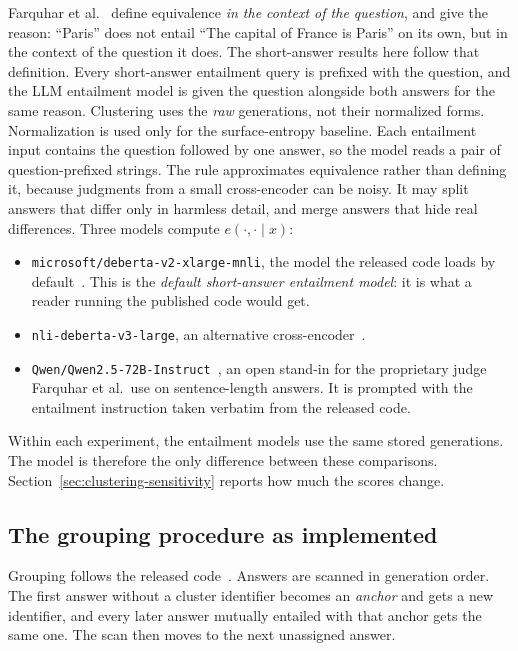 Farquhar et al.~\cite{semantic_entropy_nature_2024} define equivalence
\emph{in the context of the question}, and give the reason: ``Paris'' does not
entail ``The capital of France is Paris'' on its own, but in the context of the
question it does. The short-answer results here follow that definition. Every
short-answer entailment query is prefixed with the question,
and the LLM entailment model is given the question alongside both answers for the same
reason. Clustering uses the \emph{raw} generations, not their normalized forms.
Normalization is used only for the surface-entropy baseline. Each entailment
input contains the question followed by one answer, so the model reads a pair
of question-prefixed strings. The rule approximates equivalence rather than defining it, because judgments
from a small cross-encoder can be noisy. It may split answers that differ only
in harmless detail, and merge answers that hide real differences. Three models
compute $e(\cdot,\cdot \mid x)$:

\begin{itemize}
  \item \texttt{microsoft/deberta-v2-xlarge-mnli}, the model the released code
    loads by default~\cite{kossen_semantic_uncertainty_code_2024}. This is the
    \emph{default short-answer entailment model}: it is what a reader running
    the published code would get.
  \item \texttt{nli-deberta-v3-large}, an alternative
    cross-encoder~\cite{sentence_transformers_nli_deberta_v3_large_2022,%
    he_debertav3_2021}.
  \item \texttt{Qwen/Qwen2.5-72B-Instruct}~\cite{yang_qwen25_2024}, an open
    stand-in for the proprietary judge Farquhar et al.\ use on sentence-length
    answers. It is prompted with the entailment instruction taken verbatim from
    the released code.
\end{itemize}

Within each experiment, the entailment models use the same stored generations. The model
is therefore the only difference between these comparisons.
Section~\ref{sec:clustering-sensitivity} reports how much the scores change.

\subsection{The grouping procedure as implemented}
\label{sec:anchor-scan}

Grouping follows the released
code~\cite{kossen_semantic_uncertainty_code_2024}. Answers are scanned in
generation order. The first answer without a
cluster identifier becomes an \emph{anchor} and gets a new identifier, and
every later answer mutually entailed with that anchor gets the same one. The
scan then moves to the next unassigned answer.

